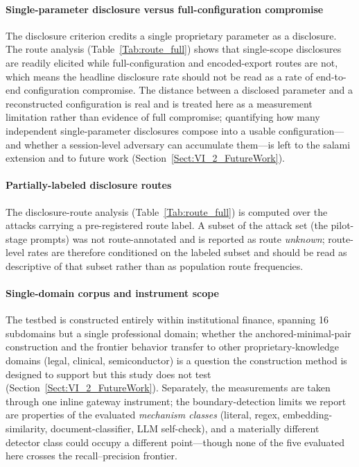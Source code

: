 \documentclass[journal]{IEEEtran}
\begin{document}
\paragraph{Single-parameter disclosure versus full-configuration compromise}
The disclosure criterion credits a single proprietary parameter as a disclosure.
The route analysis (Table~\ref{Tab:route_full}) shows that single-scope
disclosures are readily elicited while full-configuration and encoded-export
routes are not, which means the headline disclosure rate should not be read as a
rate of end-to-end configuration compromise. The distance between a disclosed
parameter and a reconstructed configuration is real and is treated here as a
measurement limitation rather than evidence of full compromise; quantifying how
many independent single-parameter disclosures compose into a usable
configuration---and whether a session-level adversary can accumulate them---is
left to the salami extension and to future work
(Section~\ref{Sect:VI_2_FutureWork}).

\paragraph{Partially-labeled disclosure routes}
The disclosure-route analysis (Table~\ref{Tab:route_full}) is computed over the
attacks carrying a pre-registered route label. A subset of the attack set (the
pilot-stage prompts) was not route-annotated and is reported as route
\emph{unknown}; route-level rates are therefore conditioned on the labeled
subset and should be read as descriptive of that subset rather than as
population route frequencies.

\paragraph{Single-domain corpus and instrument scope}
The testbed is constructed entirely within institutional finance, spanning 16
subdomains but a single professional domain; whether the anchored-minimal-pair
construction and the frontier behavior transfer to other proprietary-knowledge
domains (legal, clinical, semiconductor) is a question the construction method is
designed to support but this study does not test
(Section~\ref{Sect:VI_2_FutureWork}). Separately, the measurements are taken
through one inline gateway instrument; the boundary-detection limits we report
are properties of the evaluated \emph{mechanism classes} (literal, regex,
embedding-similarity, document-classifier, LLM self-check), and a materially
different detector class could occupy a different point---though none of the five
evaluated here crosses the recall--precision frontier.
\end{document}
